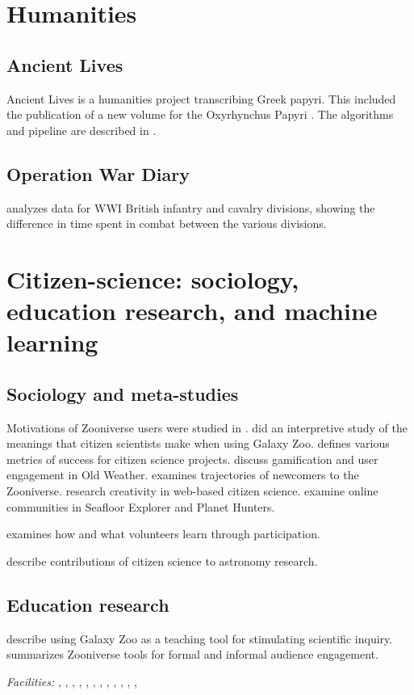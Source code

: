 \documentclass[twocolumn]{aastex6}
\begin{document}
\section{Humanities}

\subsection{Ancient Lives}

Ancient Lives is a humanities project transcribing Greek papyri. This included the publication of a new volume for the Oxyrhynchus Papyri \citep{bru13}. The algorithms and pipeline are described in \citet{wil14a,wil14}.

\subsection{Operation War Diary}

\citet{gra16} analyzes data for WWI British infantry and cavalry divisions, showing the difference in time spent in combat between the various divisions.

\section{Citizen-science: sociology, education research, and machine learning}

\subsection{Sociology and meta-studies}

Motivations of Zooniverse users were studied in \citet{rad10,rad13,jac15}. \citet{man11b} did an interpretive study of the meanings that citizen scientists make when using Galaxy Zoo. \citet{cox15} defines various metrics of success for citizen science projects. \citet{eve13,eve14,gre14} discuss gamification and user engagement in Old Weather. \citet{jac16} examines trajectories of newcomers to the Zooniverse. \citet{jen13} research creativity in web-based citizen science. \citet{luc14,mug14,mug15} examine online communities in Seafloor Explorer and Planet Hunters.

\citet{klo13,pra13,mas16} examines how and what volunteers learn through participation.

\citet{chr12,mad14} describe contributions of citizen science to astronomy research.

\subsection{Education research}

\citet{sla11} describe using Galaxy Zoo as a teaching tool for stimulating scientific inquiry. \citet{bor13} summarizes Zooniverse tools for formal and informal audience engagement.


\acknowledgments

{\it Facilities:} 
,
,
,
,
,
,
,
,
,
,
,
,


\end{document}
